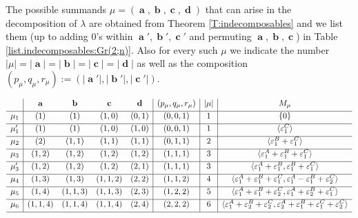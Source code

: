 \documentclass[12pt,reqno]{amsart}
\begin{document}
The possible summands $\mu=(\mbfa,\mbfb,\mbfc,\mbfd)$ that can arise in the decomposition of $\lambda$ are obtained from Theorem \ref{T:indecomposables} and we list them (up to adding $0$'s within $\mbfa',\mbfb',\mbfc'$ and permuting $\mbfa,\mbfb,\mbfc$) in Table \ref{list.indecomposables:Gr(2;n)}.
Also for every such $\mu$ we indicate the number $|\mu|=|\mbfa|=|\mbfb|=|\mbfc|=|\mbfd|$ as well as the composition $(p_\mu,q_\mu,r_\mu):=(|\mbfa'|,|\mbfb'|,|\mbfc'|)$.
\begin{table}[H]
    $\begin{array}{c|cccc|c|c|c}
     & \mathbf{a} & \mathbf{b} & \mathbf{c} & \mathbf{d} & (p_\mu,q_\mu,r_\mu) & |\mu| & M_\mu
    \\[1mm] \hline
    \mu_1 & (1) & (1) & (1,0) & (0,1)  & (0,0,1) & 1 & \{0\}
    \\[1mm] \hline
    \mu'_1 & (1) & (1) & (1,0) & (1,0)  & (0,0,1) & 1 & \langle \varepsilon_1^C\rangle
    \\[1mm] \hline
    \mu_2 & (2) & (1,1) & (1,1) & (1,1)   & (0,1,1) & 2 & \langle \varepsilon_1^B+\varepsilon_1^C\rangle
    \\[1mm] \hline
    \mu_3 & (1,2) & (1,2) & (1,2) & (1,2)   & (1,1,1) & 3 & \langle \varepsilon_1^A+\varepsilon_1^B+\varepsilon_1^C\rangle
    \\[1mm] \hline
    \mu'_3 & (1,2) & (1,2) & (1,2) & (2,1)   & (1,1,1) & 3
    & \langle \varepsilon_1^A+\varepsilon_1^B,\varepsilon_1^B+\varepsilon_1^C\rangle
    \\[1mm] \hline
    \mu_4 & (1,3) & (1,3) & (1,1,2) & (2,2)   & (1,1,2) & 4 & \langle \varepsilon_1^A+\varepsilon_1^B+\varepsilon_1^C,
    \varepsilon_1^A-\varepsilon_1^B+\varepsilon_2^C \rangle
    \\[1mm] \hline
    \mu_5 & (1,4) & (1,1,3) & (1,1,3) & (2,3)   & (1,2,2) & 5
    & \langle \varepsilon_1^A+\varepsilon_1^B+\varepsilon_2^C,
    \varepsilon_1^A+\varepsilon_2^B+\varepsilon_1^C \rangle
    \\[1mm] \hline
    \mu_6 & (1,1,4) & (1,1,4) & (1,1,4) & (2,4)   & (2,2,2) & 6
    & \langle \varepsilon_1^A+\varepsilon_2^B+\varepsilon_2^C,
    \varepsilon_2^A+\varepsilon_1^B+\varepsilon_1^C+\varepsilon_2^C \rangle
    \\[1mm] \hline
    \end{array}$
\caption{Possible indecomposable summands $\mu$ of $\lambda$}
\label{list.indecomposables:Gr(2;n)}
\end{table}
\end{document}
